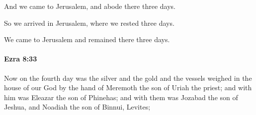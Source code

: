 			\begin{versebox}
					\item[BHS] 
					\item[LXX] 
					\item[ASV] And we came to Jerusalem, and abode there three days.
					\item[NIV] So we arrived in Jerusalem, where we rested three days.
					\item[NRSV] We came to Jerusalem and remained there three days.
			\end{versebox}

		\paragraph{Ezra 8:33} %
			\label{EZRA-8-33}

			Now on the fourth day was the silver and the gold and the vessels weighed in the house of our God by the hand of Meremoth the son of Uriah the priest; and with him was Eleazar the son of Phinehas; and with them was Jozabad the son of Jeshua, and Noadiah the son of Binnui, Levites;

